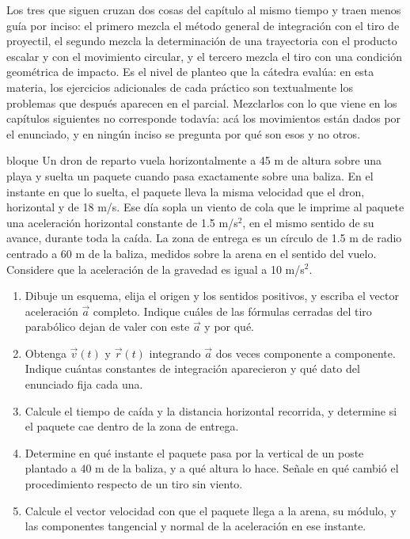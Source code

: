 \documentclass[11pt,openany]{book}
\begin{document}
Los tres que siguen cruzan dos cosas del capítulo al mismo tiempo y traen menos guía por inciso: el primero mezcla el método general de integración con el tiro de proyectil, el segundo mezcla la determinación de una trayectoria con el producto escalar y con el movimiento circular, y el tercero mezcla el tiro con una condición geométrica de impacto. Es el nivel de planteo que la cátedra evalúa: en esta materia, los ejercicios adicionales de cada práctico son textualmente los problemas que después aparecen en el parcial. Mezclarlos con lo que viene en los capítulos siguientes no corresponde todavía: acá los movimientos están dados por el enunciado, y en ningún inciso se pregunta por qué son esos y no otros.

\begin{ejercicio}{bloque}
Un dron de reparto vuela horizontalmente a 45 m de altura sobre una playa y suelta un paquete cuando pasa exactamente sobre una baliza. En el instante en que lo suelta, el paquete lleva la misma velocidad que el dron, horizontal y de 18 m/s. Ese día sopla un viento de cola que le imprime al paquete una aceleración horizontal constante de 1.5 m/s$^2$, en el mismo sentido de su avance, durante toda la caída. La zona de entrega es un círculo de 1.5 m de radio centrado a 60 m de la baliza, medidos sobre la arena en el sentido del vuelo. Considere que la aceleración de la gravedad es igual a 10 m/s$^2$.
\begin{enumerate}[label=(\alph*), leftmargin=1.7em, itemsep=1pt, topsep=3pt]
  \item Dibuje un esquema, elija el origen y los sentidos positivos, y escriba el vector aceleración $\vec a$ completo. Indique cuáles de las fórmulas cerradas del tiro parabólico dejan de valer con este $\vec a$ y por qué.
  \item Obtenga $\vec v(t)$ y $\vec r(t)$ integrando $\vec a$ dos veces componente a componente. Indique cuántas constantes de integración aparecieron y qué dato del enunciado fija cada una.
  \item Calcule el tiempo de caída y la distancia horizontal recorrida, y determine si el paquete cae dentro de la zona de entrega.
  \item Determine en qué instante el paquete pasa por la vertical de un poste plantado a 40 m de la baliza, y a qué altura lo hace. Señale en qué cambió el procedimiento respecto de un tiro sin viento.
  \item Calcule el vector velocidad con que el paquete llega a la arena, su módulo, y las componentes tangencial y normal de la aceleración en ese instante.

\end{enumerate}
\end{ejercicio}
\end{document}
